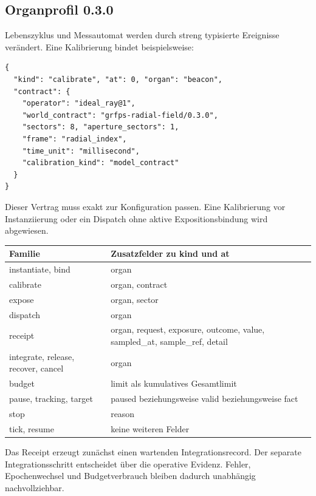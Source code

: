 \documentclass[11pt,a4paper]{article}
\begin{document}
\subsection{Organprofil 0.3.0}
Lebenszyklus und Messautomat werden durch streng typisierte
Ereignisse verändert. Eine Kalibrierung bindet beispielsweise:
\begin{lstlisting}
{
  "kind": "calibrate", "at": 0, "organ": "beacon",
  "contract": {
    "operator": "ideal_ray@1",
    "world_contract": "grfps-radial-field/0.3.0",
    "sectors": 8, "aperture_sectors": 1,
    "frame": "radial_index",
    "time_unit": "millisecond",
    "calibration_kind": "model_contract"
  }
}
\end{lstlisting}
Dieser Vertrag muss exakt zur Konfiguration passen.
Eine Kalibrierung vor Instanziierung oder ein Dispatch
ohne aktive Expositionsbindung wird abgewiesen.

\begin{tabularx}{\linewidth}{@{}lY@{}}
\toprule
Familie & Zusatzfelder zu kind und at\\\midrule
instantiate, bind & organ\\
calibrate & organ, contract\\
expose & organ, sector\\
dispatch & organ\\
receipt & organ, request, exposure, outcome, value, sampled\_at,
sample\_ref, detail\\
integrate, release, recover, cancel & organ\\
budget & limit als kumulatives Gesamtlimit\\
pause, tracking, target & paused beziehungsweise valid beziehungsweise fact\\
stop & reason\\
tick, resume & keine weiteren Felder\\
\bottomrule
\end{tabularx}
Das Receipt erzeugt zunächst einen wartenden Integrationsrecord.
Der separate Integrationsschritt entscheidet über die operative
Evidenz. Fehler, Epochenwechsel und Budgetverbrauch bleiben
dadurch unabhängig nachvollziehbar.

\clearpage
\end{document}
